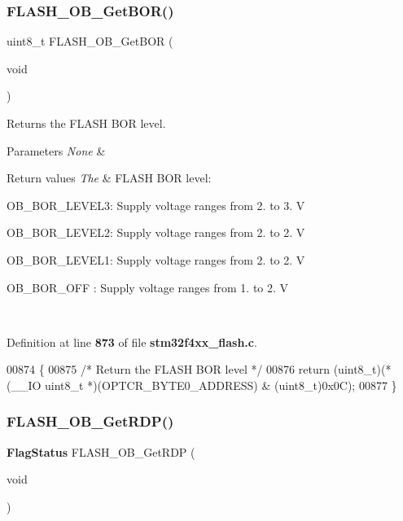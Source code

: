 \subsubsection{F\+L\+A\+S\+H\+\_\+\+O\+B\+\_\+\+Get\+B\+O\+R()}
{\footnotesize\ttfamily uint8\+\_\+t F\+L\+A\+S\+H\+\_\+\+O\+B\+\_\+\+Get\+B\+OR (\begin{DoxyParamCaption}\item[{void}]{ }\end{DoxyParamCaption})}



Returns the F\+L\+A\+SH B\+OR level. 


\begin{DoxyParams}{Parameters}
{\em None} & \\
\hline
\end{DoxyParams}

\begin{DoxyRetVals}{Return values}
{\em The} & F\+L\+A\+SH B\+OR level\+:
\begin{DoxyItemize}
\item O\+B\+\_\+\+B\+O\+R\+\_\+\+L\+E\+V\+E\+L3\+: Supply voltage ranges from 2. to 3. V
\item O\+B\+\_\+\+B\+O\+R\+\_\+\+L\+E\+V\+E\+L2\+: Supply voltage ranges from 2. to 2. V
\item O\+B\+\_\+\+B\+O\+R\+\_\+\+L\+E\+V\+E\+L1\+: Supply voltage ranges from 2. to 2. V
\item O\+B\+\_\+\+B\+O\+R\+\_\+\+O\+FF \+: Supply voltage ranges from 1. to 2. V 
\end{DoxyItemize}\\
\hline
\end{DoxyRetVals}


Definition at line \textbf{ 873} of file \textbf{ stm32f4xx\+\_\+flash.\+c}.


\begin{DoxyCode}
00874 \{
00875   \textcolor{comment}{/* Return the FLASH BOR level */}
00876   \textcolor{keywordflow}{return} (uint8\_t)(*(\_\_IO uint8\_t *)(OPTCR_BYTE0_ADDRESS) & (uint8\_t)0x0C);
00877 \}
\end{DoxyCode}
\mbox{\label{group__FLASH_ga2f0151c6c923396eaf96c554a5860c31}} 
\subsubsection{F\+L\+A\+S\+H\+\_\+\+O\+B\+\_\+\+Get\+R\+D\+P()}
{\footnotesize\ttfamily \textbf{ Flag\+Status} F\+L\+A\+S\+H\+\_\+\+O\+B\+\_\+\+Get\+R\+DP (\begin{DoxyParamCaption}\item[{void}]{ }\end{DoxyParamCaption})}



